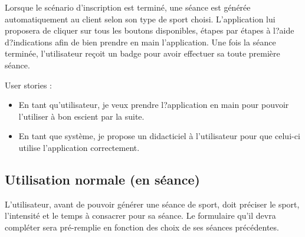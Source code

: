 Lorsque le scénario d'inscription est terminé, une séance est générée automatiquement au client selon son type de sport choisi. L'application lui proposera de cliquer sur tous les boutons disponibles, étapes par étapes à l?aide d?indications afin de bien prendre en main l'application. Une fois la séance terminée, l'utilisateur reçoit un badge pour avoir effectuer sa toute première séance.\\


\begin{itshape}

User stories :

\begin{itemize}
\item En tant qu'utilisateur, je veux prendre l?application en main pour pouvoir l'utiliser à bon escient par la suite.
\item En tant que système, je propose un didacticiel à l'utilisateur pour que celui-ci utilise l'application correctement.
\end{itemize}

\end{itshape}

\subsection{Utilisation normale (en séance)}
L'utilisateur, avant de pouvoir générer une séance de sport, doit préciser le sport, l'intensité et le temps à consacrer pour sa séance. Le formulaire qu'il devra compléter sera pré-remplie en fonction des choix de ses séances précédentes.   

